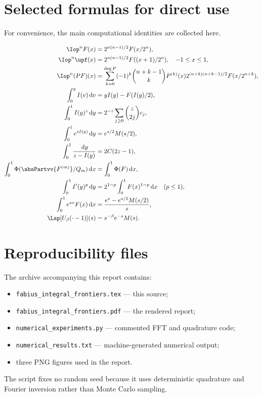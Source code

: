 \documentclass[11pt,oneside]{article}
\theoremstyle{definition}
\theoremstyle{remark}
\newcommand{\dd}{\,\mathrm d}
\newcommand{\1}{\mathbf 1}
\begin{document}
\section{Selected formulas for direct use}

For convenience, the main computational identities are collected here.

\begin{align*}
 \Iop^nF(x)&=2^{n(n-1)/2}F(x/2^n),\\
 \Iop^n\upf(x)&=2^{n(n-1)/2}F((x+1)/2^n),\quad -1\le x\le1,\\
 \Iop^n(PF)(x)&=\sum_{k=0}^{\deg P}(-1)^k\binom{n+k-1}{k}
 P^{(k)}(x)2^{(n+k)(n+k-1)/2}F(x/2^{n+k}),\\
 \int_0^yI(v)\dd v&=yI(y)-F(I(y)/2),\\
 \int_0^1I(y)^z\dd y&=2^{-z}\sum_{j\ge0}\binom z{2j}c_j,\\
 \int_0^1e^{sI(y)}\dd y&=e^{s/2}M(s/2),\\
 \int_0^1\frac{\dd y}{z-I(y)}&=2C(2z-1),\\
 \int_0^1\Phi(\absPartvv{F^{(m)}}/Q_m)\dd x&=\int_0^1\Phi(F)\dd x,\\
 \int_0^1I'(y)^p\dd y&=2^{1-p}\int_0^1F(x)^{1-p}\dd x\quad(p\le1),\\
 \int_0^1e^{sx}F(x)\dd x&=\frac{e^s-e^{s/2}M(s/2)}s,\\
 \Lap[U_\beta(\cdot-1)](s)&=s^{-\beta}e^{-s}M(s).
\end{align*}

\section{Reproducibility files}

The archive accompanying this report contains:
\begin{itemize}
 \item \texttt{fabius\_integral\_frontiers.tex} --- this source;
 \item \texttt{fabius\_integral\_frontiers.pdf} --- the rendered report;
 \item \texttt{numerical\_experiments.py} --- commented FFT and quadrature code;
 \item \texttt{numerical\_results.txt} --- machine-generated numerical output;
 \item three PNG figures used in the report.
\end{itemize}
The script fixes no random seed because it uses deterministic quadrature and
Fourier inversion rather than Monte Carlo sampling.
\end{document}
